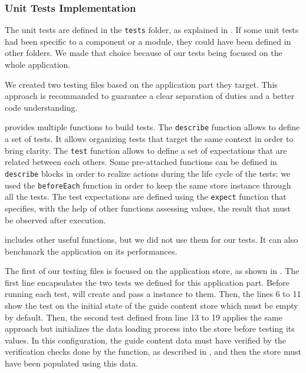 \subsubsection{Unit Tests Implementation}
\label{subsubsec:app_tests_unit_realized}

The unit tests are defined in the \texttt{tests} folder, as explained in . If some unit tests had been specific to a component or a module, they could have been defined in other folders. We made that choice because of our tests being focused on the whole application.

We created two testing files based on the application part they target. This approach is recommanded to guarantee a clear separation of duties and a better code understanding.

 provides multiple functions to build tests. The \texttt{describe} function allows to define a set of tests. It allows organizing tests that target the same context in order to bring clarity. The \texttt{test} function allows to define a set of expectations that are related between each others. Some pre-attached functions can be defined in \texttt{describe} blocks in order to realize actions during the life cycle of the tests: we used the \texttt{beforeEach} function in order to keep the same  store instance through all the tests. The test expectations are defined using the \texttt{expect} function that specifies, with the help of other functions assessing values, the result that must be observed after execution.

 includes other useful functions, but we did not use them for our tests. It can also benchmark the application on its performances.

The first of our testing files is focused on the application store, as shown in . The first line encapsulates the two tests we defined for this application part. Before running each test,  will create and pass a  instance to them. Then, the lines 6 to 11 show the test on the initial state of the guide content store which must be empty by default. Then, the second test defined from line 13 to 19 applies the same approach but initializes the data loading process into the store before testing its values. In this configuration, the guide content data must have verified by the verification checks done by the  function, as described in , and then the store must have been populated using this data.

